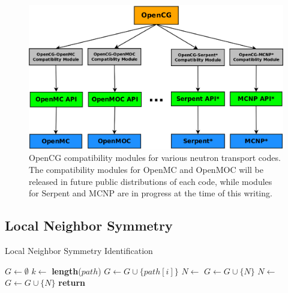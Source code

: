 \begin{figure}[h!]
  \centering
  \includegraphics[width=.8\linewidth]{figures/workflow/opencg/compatibility-modules}
  \caption{OpenCG compatibility modules for various neutron transport codes. The compatibility modules for OpenMC and OpenMOC will be released in future public distributions of each code, while modules for Serpent and MCNP are in progress at the time of this writing.}
  \label{fig:compatibility-modules}
\end{figure}


\subsection{Local Neighbor Symmetry}
\label{sec:chap3-lns}

\begin{algorithm}[h!]
\caption{Local Neighbor Symmetry Identification}
\label{alg:local-neighbor-symmetry-cells}
\begin{algorithmic}[1]
    \State $G \gets \emptyset$ 
    \State $k \gets$ \textbf{length}($path$) 
            \State $G \gets G \cup \{path[i]\}$ 
            \State $N \gets$  
            \State $G \gets G \cup \{N\}$ 
            \State $N \gets$  
            \State $G \gets G \cup \{N\}$ 
        \EndIf
    \EndFor
    \State \textbf{return}  
\EndProcedure
\end{algorithmic}
\end{algorithm}

